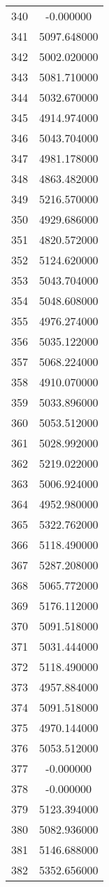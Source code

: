\documentclass[12pt]{article}
\begin{document}
\begin{longtable}{@{}cc@{}}
340 & -0.000000 \\
341 & 5097.648000 \\
342 & 5002.020000 \\
343 & 5081.710000 \\
344 & 5032.670000 \\
345 & 4914.974000 \\
346 & 5043.704000 \\
347 & 4981.178000 \\
348 & 4863.482000 \\
349 & 5216.570000 \\
350 & 4929.686000 \\
351 & 4820.572000 \\
352 & 5124.620000 \\
353 & 5043.704000 \\
354 & 5048.608000 \\
355 & 4976.274000 \\
356 & 5035.122000 \\
357 & 5068.224000 \\
358 & 4910.070000 \\
359 & 5033.896000 \\
360 & 5053.512000 \\
361 & 5028.992000 \\
362 & 5219.022000 \\
363 & 5006.924000 \\
364 & 4952.980000 \\
365 & 5322.762000 \\
366 & 5118.490000 \\
367 & 5287.208000 \\
368 & 5065.772000 \\
369 & 5176.112000 \\
370 & 5091.518000 \\
371 & 5031.444000 \\
372 & 5118.490000 \\
373 & 4957.884000 \\
374 & 5091.518000 \\
375 & 4970.144000 \\
376 & 5053.512000 \\
377 & -0.000000 \\
378 & -0.000000 \\
379 & 5123.394000 \\
380 & 5082.936000 \\
381 & 5146.688000 \\
382 & 5352.656000 \\

\end{longtable}
\end{document}
